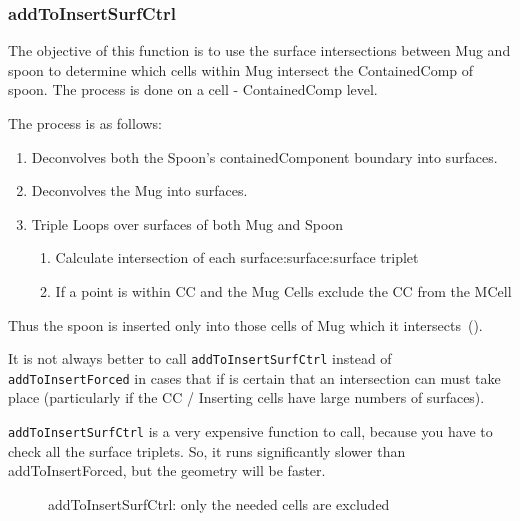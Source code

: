 \subsubsection{addToInsertSurfCtrl}

The objective of this function is to use the surface intersections between Mug and spoon to determine which
cells within Mug intersect the ContainedComp of spoon. The process is done on a cell - ContainedComp level.

The process is as follows:
\begin{enumerate}

\item{Deconvolves both the Spoon's containedComponent boundary into surfaces.}
\item Deconvolves the Mug into surfaces.
\item{Triple Loops over surfaces of both Mug and Spoon}
  \begin{enumerate}
  \item{Calculate intersection of each surface:surface:surface triplet}
  \item{If a point is within CC and the Mug Cells exclude the CC from the
    MCell}
  \end{enumerate}
\end{enumerate}

Thus the spoon is inserted only into those cells of Mug which it intersects~().

It is not always better to call {\tt addToInsertSurfCtrl} instead of
{\tt addToInsertForced} in cases that if is certain that an
intersection can must take place (particularly if the CC / Inserting
cells have large numbers of surfaces).

{\tt addToInsertSurfCtrl} is a very expensive function to call,
because you have to check all the surface triplets. So, it runs significantly
slower than addToInsertForced, but the geometry will be faster.

\begin{figure}
  \centering
   \quad
  \caption{addToInsertSurfCtrl: only the needed cells are excluded}
  \label{fig:surfctrl}
\end{figure}

